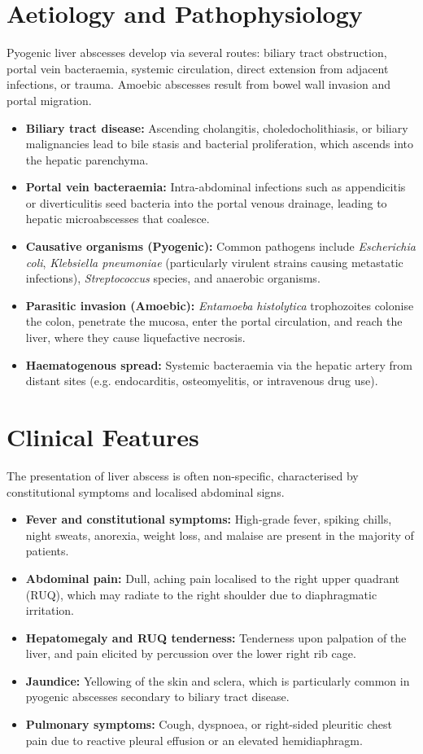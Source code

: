 \section*{Aetiology and Pathophysiology}
Pyogenic liver abscesses develop via several routes: biliary tract obstruction, portal vein bacteraemia, systemic circulation, direct extension from adjacent infections, or trauma. Amoebic abscesses result from bowel wall invasion and portal migration.
\begin{itemize}
    \item \textbf{Biliary tract disease:} Ascending cholangitis, choledocholithiasis, or biliary malignancies lead to bile stasis and bacterial proliferation, which ascends into the hepatic parenchyma.
    \item \textbf{Portal vein bacteraemia:} Intra-abdominal infections such as appendicitis or diverticulitis seed bacteria into the portal venous drainage, leading to hepatic microabscesses that coalesce.
    \item \textbf{Causative organisms (Pyogenic):} Common pathogens include \textit{Escherichia coli}, \textit{Klebsiella pneumoniae} (particularly virulent strains causing metastatic infections), \textit{Streptococcus} species, and anaerobic organisms.
    \item \textbf{Parasitic invasion (Amoebic):} \textit{Entamoeba histolytica} trophozoites colonise the colon, penetrate the mucosa, enter the portal circulation, and reach the liver, where they cause liquefactive necrosis.
    \item \textbf{Haematogenous spread:} Systemic bacteraemia via the hepatic artery from distant sites (e.g. endocarditis, osteomyelitis, or intravenous drug use).
\end{itemize}

\section*{Clinical Features}
The presentation of liver abscess is often non-specific, characterised by constitutional symptoms and localised abdominal signs.
\begin{itemize}
    \item \textbf{Fever and constitutional symptoms:} High-grade fever, spiking chills, night sweats, anorexia, weight loss, and malaise are present in the majority of patients.
    \item \textbf{Abdominal pain:} Dull, aching pain localised to the right upper quadrant (RUQ), which may radiate to the right shoulder due to diaphragmatic irritation.
    \item \textbf{Hepatomegaly and RUQ tenderness:} Tenderness upon palpation of the liver, and pain elicited by percussion over the lower right rib cage.
    \item \textbf{Jaundice:} Yellowing of the skin and sclera, which is particularly common in pyogenic abscesses secondary to biliary tract disease.
    \item \textbf{Pulmonary symptoms:} Cough, dyspnoea, or right-sided pleuritic chest pain due to reactive pleural effusion or an elevated hemidiaphragm.
\end{itemize}

